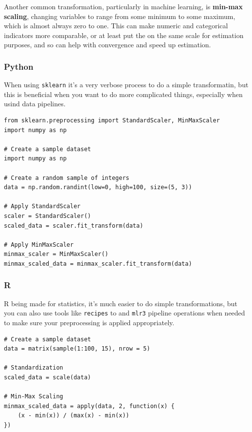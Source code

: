 \documentclass[
  letterpaper,
]{krantz}
\begin{document}
Another common transformation, particularly in machine learning, is
\textbf{min-max scaling}, changing variables to range from some minimum
to some maximum, which is almost always zero to one. This can make
numeric and categorical indicators more comparable, or at least put the
on the same scale for estimation purposes, and so can help with
convergence and speed up estimation.

\subsubsection{Python}

When using \texttt{sklearn} it's a very verbose process to do a simple
transformatin, but this is beneficial when you want to do more
complicated things, especially when usind data pipelines.

\begin{verbatim}
from sklearn.preprocessing import StandardScaler, MinMaxScaler
import numpy as np

# Create a sample dataset
import numpy as np

# Create a random sample of integers
data = np.random.randint(low=0, high=100, size=(5, 3))

# Apply StandardScaler
scaler = StandardScaler()
scaled_data = scaler.fit_transform(data)

# Apply MinMaxScaler
minmax_scaler = MinMaxScaler()
minmax_scaled_data = minmax_scaler.fit_transform(data)
\end{verbatim}

\subsubsection{R}

R being made for statistics, it's much easier to do simple
transformations, but you can also use tools like \texttt{recipes} to and
\texttt{mlr3} pipeline operations when needed to make sure your
preprocessing is applied appropriately.

\begin{verbatim}
# Create a sample dataset
data = matrix(sample(1:100, 15), nrow = 5)

# Standardization
scaled_data = scale(data)

# Min-Max Scaling
minmax_scaled_data = apply(data, 2, function(x) {
    (x - min(x)) / (max(x) - min(x))
})
\end{verbatim}
\end{document}
